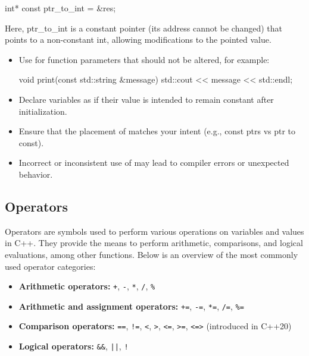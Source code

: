 \begin{codeblock}[language=C++, numbers=none]
int* const ptr_to_int = &res;
\end{codeblock}

Here, ptr\_to\_int is a constant pointer (its address cannot be changed) that points to a non-constant int, allowing modifications to the pointed value.

\begin{tipsblock}
\begin{itemize}
    \item Use  for function parameters that should not be altered, for example:
    \vspace{-0.5em}
    \begin{codeblock}[language=C++, numbers=none]
void print(const std::string &message) {
    std::cout << message << std::endl;
}
    \end{codeblock}
    \vspace{-0.5em}
    \item Declare variables as  if their value is intended to remain constant after initialization.
    \item Ensure that the placement of  matches your intent (e.g., const ptrs vs ptr to const).
    \item Incorrect or inconsistent use of  may lead to compiler errors or unexpected behavior.
\end{itemize}
\end{tipsblock}

\vspace{-0.5em}

\subsection{Operators}

Operators are symbols used to perform various operations on variables and values in C++. They provide the means to perform arithmetic, comparisons, and logical evaluations, among other functions. Below is an overview of the most commonly used operator categories:

\vspace{0.5em}

\begin{itemize}
    \item \textbf{Arithmetic operators:} \texttt{+}, \texttt{-}, \texttt{*}, \texttt{/}, \texttt{\%}
    \item \textbf{Arithmetic and assignment operators:} \texttt{+=}, \texttt{-=}, \texttt{*=}, \texttt{/=}, \texttt{\%=}
    \item \textbf{Comparison operators:} \texttt{==}, \texttt{!=}, \texttt{<}, \texttt{>}, \texttt{<=}, \texttt{>=}, \texttt{<=>} (introduced in C++20)
    \item \textbf{Logical operators:} \texttt{\&\&}, \texttt{||}, \texttt{!}
\end{itemize}

